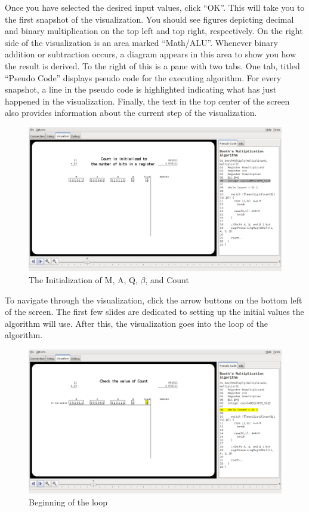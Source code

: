 \documentclass{article}
\begin{document}
Once you have selected the desired input values, click ``OK''.
This will take you to the first snapshot of the visualization.
You should see figures depicting decimal and binary multiplication on the top left and top right, respectively.
On the right side of the visualization is an area marked ``Math/ALU''.
Whenever binary addition or subtraction occurs, a diagram appears in this area to show you how the result is derived.
To the right of this is a pane with two tabs.
One tab, titled ``Pseudo Code'' displays pseudo code for the executing algorithm.
For every snapshot, a line in the pseudo code is highlighted indicating what has just happened in the visualization.
Finally, the text in the top center of the screen also provides information about the current step of the visualization.

\begin{figure}[h]
\centering
\includegraphics[scale=0.3]{initreg.pdf}
\caption{The Initialization of M, A, Q, $\beta$, and Count}%
\end{figure}

To navigate through the visualization, click the arrow buttons on the bottom left of the screen.
The first few slides are dedicated to setting up the initial values the algorithm will use.
After this, the visualization goes into the loop of the algorithm.

\pagebreak
\begin{figure}[h]
\centering
\includegraphics[scale=0.3]{looptop.pdf}
\caption{Beginning of the loop}
\end{figure}
\end{document}
